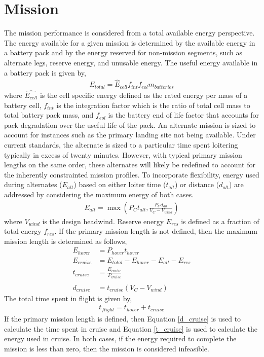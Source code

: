 \documentclass[12pt, letter]{article}
\begin{document}
\section{Mission}
The mission performance is considered from a total available energy perspective. The energy available for a given mission is determined by the available energy in a battery pack and by the energy reserved for non-mission segments, such as alternate legs, reserve energy, and unusable energy. The useful energy available in a battery pack is given by,
\begin{align}
	E_{total}=\hat{E}_{cell} f_{int} f_{eol} m_{batteries}
\end{align}
where $\hat{E_{cell}}$ is the cell specific energy defined as the rated energy per mass of a battery cell, $f_{int}$ is the integration factor which is the ratio of total cell mass to total battery pack mass, and $f_{eol}$ is the battery end of life factor that accounts for pack degradation over the useful life of the pack. An alternate mission is sized to account for instances such as the primary landing site not being available. Under current standards, the alternate is sized to a particular time spent loitering typically in excess of twenty minutes. However, with typical primary mission lengths on the same order, these alternates will likely be redefined to account for the inherently constrainted mission profiles. To incorporate flexibility, energy used during alternates ($E_{alt}$) based on either loiter time ($t_{alt}$) or distance ($d_{alt}$) are addressed by considering the maximum energy of both cases.
\begin{align}
	E_{alt}=\max \left({P_C t_{alt}, \frac{P_C d_{alt}}{V_C-V_{wind}}}\right)
\end{align}
where $V_{wind}$ is the design headwind. Reserve energy $E_{res}$ is defined as a fraction of total energy $f_{res}$. If the primary mission length is not defined, then the maximum mission length is determined as follows,
\begin{align}
	E_{hover}	 &= P_{hover} t_{hover} \\
	E_{cruise} &= E_{total} - E_{hover} - E_{alt} - E_{res} \\ 
	t_{cruise} &= \frac{E_{cruise}}{P_{cruise}} \\ \label{t_cruise} \\
	d_{cruise} &= t_{cruise} \left( V_C - V_{wind} \right) \label{d_cruise}
\end{align}
The total time spent in flight is given by,
\begin{align}
	t_{flight}=t_{hover}+t_{cruise}
\end{align}
If the primary mission length is defined, then Equation \ref{d_cruise} is used to calculate the time spent in cruise and Equation \ref{t_cruise} is used to calculate the energy used in cruise. In both cases, if the energy required to complete the mission is less than zero, then the mission is considered infeasible. 
\end{document}
